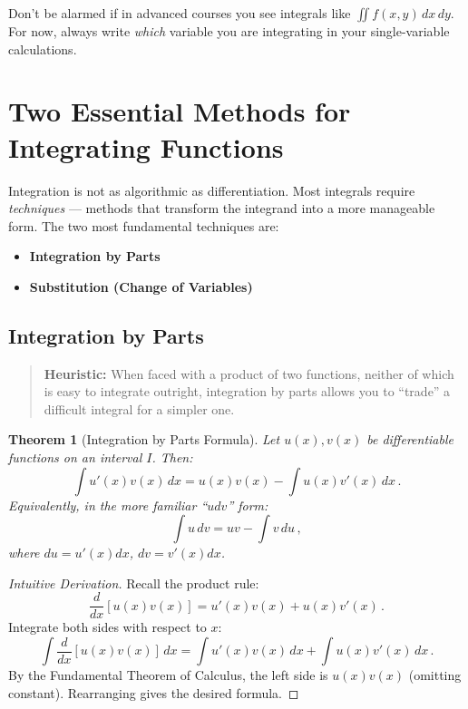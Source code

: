 \documentclass[11pt]{article}
\newtheorem{theorem}[definition]{Theorem}
\theoremstyle{definition}
\begin{document}
Don't be alarmed if in advanced courses you see integrals like $\iint f(x, y)\, dx\,dy$. For now, always write \emph{which} variable you are integrating in your single-variable calculations.

\section{Two Essential Methods for Integrating Functions}

Integration is not as algorithmic as differentiation. Most integrals require \emph{techniques} — methods that transform the integrand into a more manageable form. The two most fundamental techniques are:

\begin{itemize}
    \item \textbf{Integration by Parts}
    \item \textbf{Substitution (Change of Variables)}
\end{itemize}

\subsection{Integration by Parts}

\vspace{1ex}
\begin{quote}
\textbf{Heuristic:} When faced with a product of two functions, neither of which is easy to integrate outright, integration by parts allows you to ``trade'' a difficult integral for a simpler one.
\end{quote}
\vspace{1ex}

\begin{theorem}[Integration by Parts Formula]\label{thm:parts}
Let $u(x), v(x)$ be differentiable functions on an interval $I$. Then:
\[
    \int u'(x) v(x)\, dx = u(x) v(x) - \int u(x) v'(x)\, dx\,.
\]
Equivalently, in the more familiar ``$udv$'' form:
\[
    \int u\, dv = uv - \int v\, du\,,
\]
where $du = u'(x)dx$, $dv = v'(x)dx$.
\end{theorem}

\begin{proof}[Intuitive Derivation]
Recall the product rule:
\[
    \frac{d}{dx} [u(x) v(x)] = u'(x) v(x) + u(x) v'(x)\,.
\]
Integrate both sides with respect to $x$:
\[
    \int \frac{d}{dx}[u(x)v(x)]\,dx = \int u'(x) v(x)\,dx + \int u(x) v'(x)\,dx\,.
\]
By the Fundamental Theorem of Calculus, the left side is $u(x)v(x)$ (omitting constant). Rearranging gives the desired formula.
\end{proof}
\end{document}
